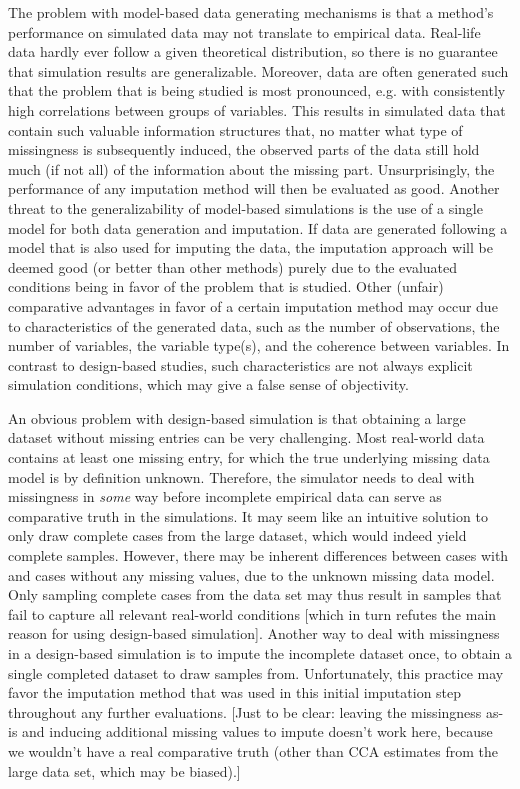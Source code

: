 \documentclass[bimj,fleqn]{w-art}
\begin{document}
The problem with model-based data generating mechanisms is that a method's performance on simulated data may not translate to empirical data. Real-life data hardly ever follow a given theoretical distribution, so there is no guarantee that simulation results are generalizable. Moreover, data are often generated such that the problem that is being studied is most pronounced, e.g. with consistently high correlations between groups of variables. This results in simulated data that contain such valuable information structures that, no matter what type of missingness is subsequently induced, the observed parts of the data still hold much (if not all) of the information about the missing part. Unsurprisingly, the performance of any imputation method will then be evaluated as good. Another threat to the generalizability of model-based simulations is the use of a single model for both data generation and imputation. If data are generated following a model that is also used for imputing the data, the imputation approach will be deemed good (or better than other methods) purely due to the evaluated conditions being in favor of the problem that is studied. Other (unfair) comparative advantages in favor of a certain imputation method may occur due to characteristics of the generated data, such as the number of observations, the number of variables, the variable type(s), and the coherence between variables. In contrast to design-based studies, such characteristics are not always explicit simulation conditions, which may give a false sense of objectivity.

An obvious problem with design-based simulation is that obtaining a large dataset without missing entries can be very challenging. Most real-world data contains at least one missing entry, for which the true underlying missing data model is by definition unknown. Therefore, the simulator needs to deal with missingness in \textit{some} way before incomplete empirical data can serve as comparative truth in the simulations. It may seem like an intuitive solution to only draw complete cases from the large dataset, which would indeed yield complete samples. However, there may be inherent differences between cases with and cases without any missing values, due to the unknown missing data model. Only sampling complete cases from the data set may thus result in samples that fail to capture all relevant real-world conditions [which in turn refutes the main reason for using design-based simulation]. Another way to deal with missingness in a design-based simulation is to impute the incomplete dataset once, to obtain a single completed dataset to draw samples from. Unfortunately, this practice may favor the imputation method that was used in this initial imputation step throughout any further evaluations. [Just to be clear: leaving the missingness as-is and inducing additional missing values to impute doesn't work here, because we wouldn't have a real comparative truth (other than CCA estimates from the large data set, which may be biased).]
\end{document}
